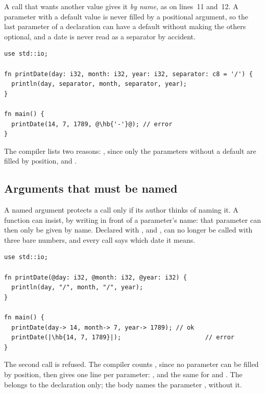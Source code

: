 A call that wants another value gives it \emph{by name}, as on lines~11 and~12.
A parameter with a default value is never filled by a positional argument, so the
last parameter of a declaration can have a default without making the others
optional, and a date is never read as a separator by accident.

\begin{lstlisting}[style=coloredverbatimError, escapechar=@, caption=A default value given by position]
use std::io;

fn printDate(day: i32, month: i32, year: i32, separator: c8 = '/') {
  println(day, separator, month, separator, year);
}

fn main() {
  printDate(14, 7, 1789, @\hb{'-'}@); // error
}
\end{lstlisting}

The compiler lists two reasons: , since only the parameters without a default are filled by
position, and .

\subsection{Arguments that must be named}

A named argument protects a call only if its author thinks of naming it. A
function can insist, by writing  in front of a parameter's name: that
parameter can then only be given by name. Declared with
,  and ,  can no longer
be called with three bare numbers, and every call says which date it means.

\begin{lstlisting}[style=coloredverbatimError, escapechar=|, caption=Parameters that must be named]
use std::io;

fn printDate(@day: i32, @month: i32, @year: i32) {
  println(day, "/", month, "/", year);
}

fn main() {
  printDate(day-> 14, month-> 7, year-> 1789); // ok
  printDate(|\hb{14, 7, 1789}|);                       // error
}
\end{lstlisting}

The second call is refused. The compiler counts
, since no parameter
can be filled by position, then gives one line per parameter:
, and the same for
 and . The
 belongs to the declaration only; the body names the parameter
, without it.

